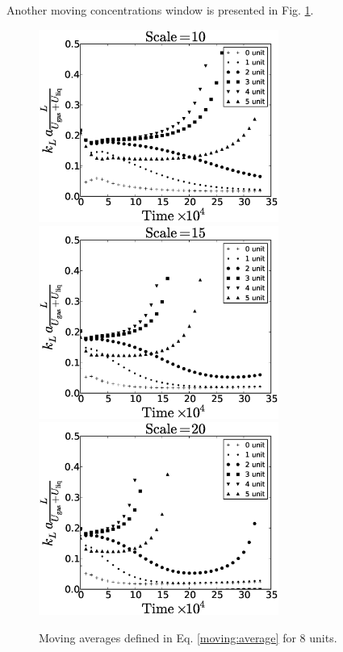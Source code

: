 \documentclass{article}
\begin{document}
Another moving concentrations window is presented in Fig. \ref{fig:moving:average:window6}.
\begin{figure}[htb!]
\includegraphics[width=0.7\textwidth]{Figures/aver_moving_window6scale10.eps}\\
\includegraphics[width=0.7\textwidth]{Figures/aver_moving_window6scale15.eps}\\
\includegraphics[width=0.7\textwidth]{Figures/aver_moving_window6scale20.eps}\\
\caption{Moving averages defined in Eq. \ref{moving:average} for $8$ units.
\label{fig:moving:average:window6}}
\end{figure}
\end{document}
